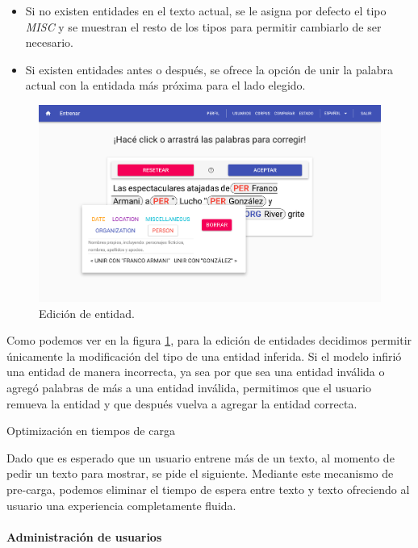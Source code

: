 \documentclass[12pt,a4paper,]{scrartcl}
\providecommand{\tightlist}{%
  \setlength{\itemsep}{0pt}\setlength{\parskip}{0pt}}
\let\oldparagraph\paragraph
\renewcommand{\paragraph}[1]{\oldparagraph{#1}\mbox{}}
\begin{document}
\begin{itemize}
\tightlist
\item
  Si no existen entidades en el texto actual, se le asigna por defecto el tipo \emph{MISC} y se muestran el resto de los tipos para permitir cambiarlo de ser necesario.
\item
  Si existen entidades antes o después, se ofrece la opción de unir la palabra actual con la entidada más próxima para el lado elegido.
\end{itemize}

\begin{figure}[H]

{\centering \includegraphics{assets/logic/train-popup.pdf} 

}

\caption{Edición de entidad.}\label{fig:logic-train-popup}
\end{figure}

Como podemos ver en la figura \ref{fig:logic-train-popup}, para la edición de entidades decidimos permitir únicamente la modificación del tipo de una entidad inferida.
Si el modelo infirió una entidad de manera incorrecta, ya sea por que sea una entidad inválida o agregó palabras de más a una entidad inválida, permitimos que el usuario remueva la entidad y que después vuelva a agregar la entidad correcta.

Optimización en tiempos de carga

Dado que es esperado que un usuario entrene más de un texto, al momento de pedir un texto para mostrar, se pide el siguiente. Mediante este mecanismo de pre-carga, podemos eliminar el tiempo de espera entre texto y texto ofreciendo al usuario una experiencia completamente fluida.

\hypertarget{administraciuxf3n-de-usuarios}{%
\paragraph{Administración de usuarios}\label{administraciuxf3n-de-usuarios}}
\end{document}
